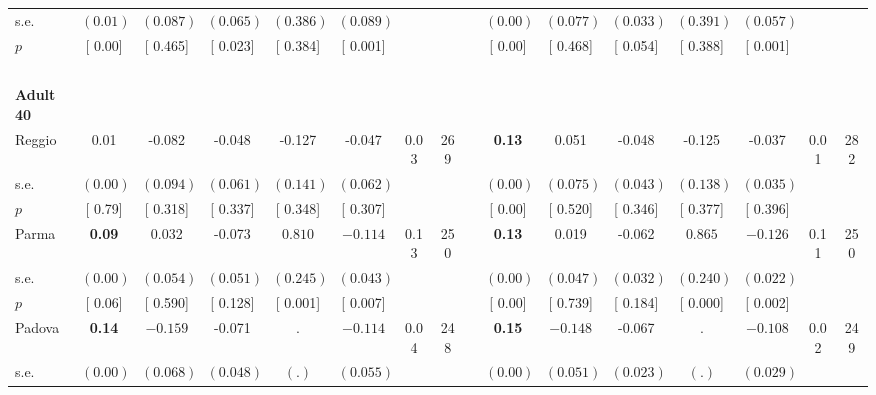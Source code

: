 \begin{longtable}{L{8em} c c c c c c c p{1em} c c c c c c c}
\quad \quad \quad \quad s.e.& $ (     0.01)$ & $ (    0.087)$ & $ (    0.065)$ & $ (    0.386)$ & $ (    0.089)$ & & & & $ (     0.00)$ & $ (    0.077)$ & $ (    0.033)$ & $ (    0.391)$ & $ (    0.057)$ & &  \\*
\quad \quad \quad \quad $ p$ & [     0.00] & [    0.465] & [    0.023] & [    0.384] & [    0.001] & & & & [     0.00] & [    0.468] & [    0.054] & [    0.388] & [    0.001] & &  \\[1em]
~\\[1em]
\quad \quad \textbf{Adult 40} & & & & & & & & & & & & & & & \\* 
\quad \quad \quad Reggio& 0.01 &    -0.082 &    -0.048 &    -0.127 &    -0.047 &      0.03 &       269 & & \textbf{     0.13} &     0.051 &    -0.048 &    -0.125 &    -0.037 &      0.01 &       282  \\*
\quad \quad \quad \quad s.e.& $ (     0.00)$ & $ (    0.094)$ & $ (    0.061)$ & $ (    0.141)$ & $ (    0.062)$ & & & & $ (     0.00)$ & $ (    0.075)$ & $ (    0.043)$ & $ (    0.138)$ & $ (    0.035)$ & &  \\*
\quad \quad \quad \quad $ p$ & [     0.79] & [    0.318] & [    0.337] & [    0.348] & [    0.307] & & & & [     0.00] & [    0.520] & [    0.346] & [    0.377] & [    0.396] & &  \\[1em]
\quad \quad \quad Parma& \textbf{     0.09} &     0.032 &    -0.073 & $ \mathbf{    0.810}$ & $ \mathbf{   -0.114}$ &      0.13 &       250 & & \textbf{     0.13} &     0.019 &    -0.062 & $ \mathbf{    0.865}$ & $ \mathbf{   -0.126}$ &      0.11 &       250  \\*
\quad \quad \quad \quad s.e.& $ (     0.00)$ & $ (    0.054)$ & $ (    0.051)$ & $ (    0.245)$ & $ (    0.043)$ & & & & $ (     0.00)$ & $ (    0.047)$ & $ (    0.032)$ & $ (    0.240)$ & $ (    0.022)$ & &  \\*
\quad \quad \quad \quad $ p$ & [     0.06] & [    0.590] & [    0.128] & [    0.001] & [    0.007] & & & & [     0.00] & [    0.739] & [    0.184] & [    0.000] & [    0.002] & &  \\[1em]
\quad \quad \quad Padova& \textbf{     0.14} & $ \mathbf{   -0.159}$ &    -0.071 &         . & $ \mathbf{   -0.114}$ &      0.04 &       248 & & \textbf{     0.15} & $ \mathbf{   -0.148}$ &    -0.067 &         . & $ \mathbf{   -0.108}$ &      0.02 &       249  \\*
\quad \quad \quad \quad s.e.& $ (     0.00)$ & $ (    0.068)$ & $ (    0.048)$ & $ (        .)$ & $ (    0.055)$ & & & & $ (     0.00)$ & $ (    0.051)$ & $ (    0.023)$ & $ (        .)$ & $ (    0.029)$ & &  \\*

\end{longtable}
